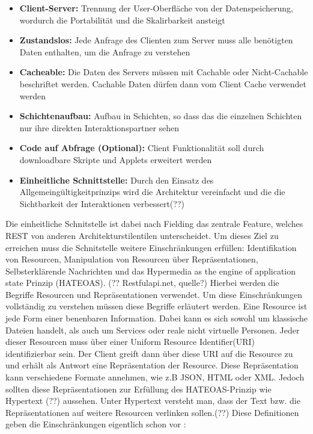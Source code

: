 \begin{itemize}
\item \textbf{Client-Server:} Trennung der User-Oberfläche von der Datenspeicherung, wordurch die Portabilität und die Skalirbarkeit ansteigt
\item \textbf{Zustandslos:} Jede Anfrage des Clienten zum Server muss alle benötigten Daten enthalten, um die Anfrage zu verstehen
\item \textbf{Cacheable:} Die Daten des Servers müssen mit Cachable oder Nicht-Cachable beschriftet werden. Cachable Daten dürfen dann vom Client Cache verwendet werden
\item \textbf{Schichtenaufbau:} Aufbau in Schichten, so dass das die einzelnen Schichten nur ihre direkten Interaktionspartner sehen
\item \textbf{Code auf Abfrage (Optional):} Client Funktionalität soll durch downloadbare Skripte und Applets erweitert werden 
\item \textbf{Einheitliche Schnittstelle:} Durch den Einsatz des Allgemeingültigkeitprinzips wird die Architektur vereinfacht und die die Sichtbarkeit der Interaktionen verbessert(??)
\end{itemize}

Die einheitliche Schnitstelle ist dabei nach Fielding das zentrale Feature, welches REST von anderen Architekturstilentilen unterscheidet. Um dieses Ziel zu erreichen muss die Schnitstelle weitere Einschränkungen erfüllen: Identifikation von Resourcen, Manipulation von Resourcen über Repräsentationen, Selbsterklärende Nachrichten und das Hypermedia as the engine of application state Prinzip (HATEOAS). 
\newline
(?? Restfulapi.net, quelle?) Hierbei werden die Begriffe Resourcen und Repräsentationen verwendet. Um diese Einschränkungen vollständig zu verstehen müssen diese Begriffe erläutert werden. Eine Resource ist jede Form einer benenbaren Information. Dabei kann es sich sowohl um klassische Dateien handelt, als auch um Services oder reale nicht virtuelle Personen. Jeder dieser Resourcen muss über einer Uniform Resource Identifier(URI) identifizierbar sein. Der Client greift dann über diese URI auf die Resource zu und erhält als Antwort eine Repräsentation der Resource. Diese Repräsentation kann verschiedene Formate annehmen, wie z.B JSON, HTML oder XML. Jedoch sollten diese Repräsentationen zur Erfüllung des HATEOAS-Prinzip wie Hypertext (??) aussehen. \cite{Fielding,2008} Unter Hypertext versteht man, dass der Text bzw. die Repräsentationen auf weitere Resourcen verlinken sollen.(??) \cite{Fielding,2009} Diese Definitionen geben die Einschränkungen eigentlich schon vor \cite{Fielding,2000}:

